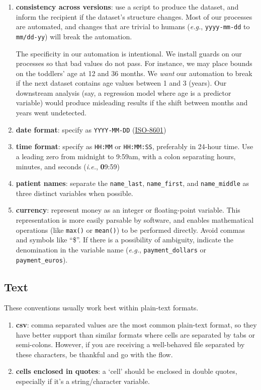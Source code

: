 \documentclass[
]{book}
\begin{document}
\begin{enumerate}
\def\labelenumi{\arabic{enumi}.}
\item
  \textbf{consistency across versions}: use a script to produce the dataset, and inform the recipient if the dataset's structure changes. Most of our processes are automated, and changes that are trivial to humans (\emph{e.g.}, \texttt{yyyy-mm-dd} to \texttt{mm/dd-yy}) will break the automation.

  The specificity in our automation is intentional. We install guards on our processes so that bad values do not pass. For instance, we may place bounds on the toddlers' age at 12 and 36 months. We \emph{want} our automation to break if the next dataset contains age values between 1 and 3 (years). Our downstream analysis (say, a regression model where age is a predictor variable) would produce misleading results if the shift between months and years went undetected.
\item
  \textbf{date format}: specify as \texttt{YYYY-MM-DD} (\href{https://www.explainxkcd.com/wiki/index.php/1179:_ISO_8601}{ISO-8601})
\item
  \textbf{time format}: specify as \texttt{HH:MM} or \texttt{HH:MM:SS}, preferably in 24-hour time. Use a leading zero from midnight to 9:59am, with a colon separating hours, minutes, and seconds (\emph{i.e.}, \textbf{0}9:59)
\item
  \textbf{patient names}: separate the \texttt{name\_last}, \texttt{name\_first}, and \texttt{name\_middle} as three distinct variables when possible.
\item
  \textbf{currency}: represent money as an integer or floating-point variable. This representation is more easily parsable by software, and enables mathematical operations (like \texttt{max()} or \texttt{mean()}) to be performed directly. Avoid commas and symbols like ``\$''. If there is a possibility of ambiguity, indicate the denomination in the variable name (\emph{e.g.}, \texttt{payment\_dollars} or \texttt{payment\_euros}).
\end{enumerate}

\hypertarget{data-conventions-text}{%
\subsection{Text}\label{data-conventions-text}}

These conventions usually work best within plain-text formats.

\begin{enumerate}
\def\labelenumi{\arabic{enumi}.}
\item
  \textbf{csv}: comma separated values are the most common plain-text format, so they have better support than similar formats where cells are separated by tabs or semi-colons. However, if you are receiving a well-behaved file separated by these characters, be thankful and go with the flow.
\item
  \textbf{cells enclosed in quotes}: a `cell' should be enclosed in double quotes, especially if it's a string/character variable.
\end{enumerate}
\end{document}
